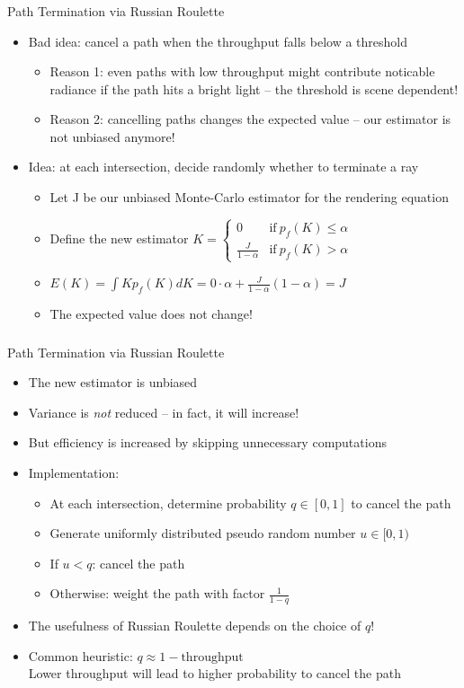 \documentclass[utf8,stillsansserifmath,fleqn,t]{beamer}
\newcommand{\ds}{\displaystyle}
\begin{document}
\begin{frame}[label=rr-2]
\frametitle{\insertsection}
Path Termination via Russian Roulette
\begin{itemize}
\item Bad idea: cancel a path when the throughput falls below a threshold
    \begin{itemize}
    \item Reason 1: even paths with low throughput might contribute noticable radiance if the path
    hits a bright light -- the threshold is scene dependent!
    \item Reason 2: cancelling paths changes the expected value -- our estimator is not unbiased anymore!
    \end{itemize}
\item Idea: at each intersection, decide randomly whether to terminate a ray
    \begin{itemize}
    \item Let J be our unbiased Monte-Carlo estimator for the rendering equation\\
    \item Define the new estimator $\ds K = \begin{cases} 0 & \text{if}~p_f(K) \leq \alpha\\\frac{J}{1-\alpha}& \text{if}~p_f(K) > \alpha\end{cases}$
    \item $\ds E(K) = \int K p_f(K)dK= 0 \cdot \alpha + \frac{J}{1-\alpha}(1-\alpha) = J$
    \item The expected value does not change!
    \end{itemize}
\end{itemize}
\end{frame}

\begin{frame}[label=rr-3]
\frametitle{\insertsection}
Path Termination via Russian Roulette
\begin{itemize}
\item The new estimator is unbiased
\item Variance is \emph{not} reduced -- in fact, it will increase!
\item But efficiency is increased by skipping unnecessary computations
\item Implementation:
    \begin{itemize}
    \item At each intersection, determine probability $q\in[0,1]$ to cancel the path
    \item Generate uniformly distributed pseudo random number $u\in [0,1)$
    \item If $u < q$: cancel the path
    \item Otherwise: weight the path with factor $\frac{1}{1-q}$
    \end{itemize}
\item The usefulness of Russian Roulette depends on the choice of $q$!
\item Common heuristic: $q \approx 1 - \text{throughput}$\\
    Lower throughput will lead to higher probability to cancel the path
\end{itemize}
\end{frame}
\end{document}
